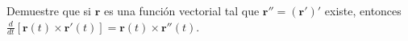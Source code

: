 \item Demuestre que si $\mathbf{r}$ es una función vectorial tal que $\mathbf{r}'' = (\mathbf{r}')'$ existe, entonces $\frac{d}{dt}[\mathbf{r}(t) \times \mathbf{r}'(t)] = \mathbf{r}(t) \times \mathbf{r}''(t)$.
